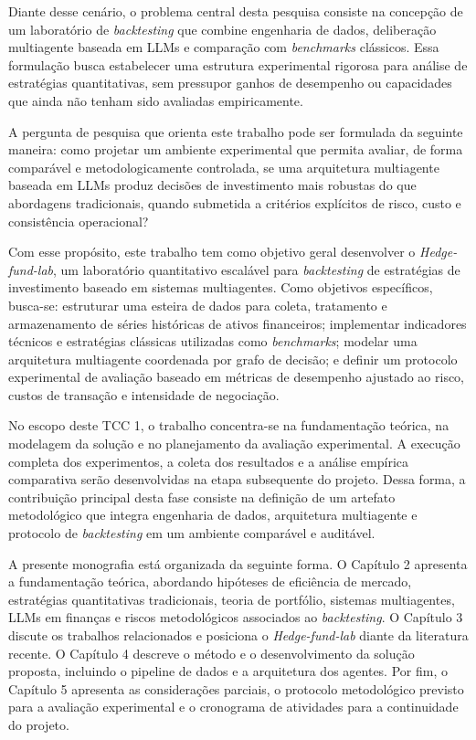 \documentclass{eic-bcc-tcc}
\begin{document}
Diante desse cenário, o problema central desta pesquisa consiste na concepção de um laboratório de \textit{backtesting} que combine engenharia de dados, deliberação multiagente baseada em LLMs e comparação com \textit{benchmarks} clássicos. Essa formulação busca estabelecer uma estrutura experimental rigorosa para análise de estratégias quantitativas, sem pressupor ganhos de desempenho ou capacidades que ainda não tenham sido avaliadas empiricamente.

A pergunta de pesquisa que orienta este trabalho pode ser formulada da seguinte maneira: como projetar um ambiente experimental que permita avaliar, de forma comparável e metodologicamente controlada, se uma arquitetura multiagente baseada em LLMs produz decisões de investimento mais robustas do que abordagens tradicionais, quando submetida a critérios explícitos de risco, custo e consistência operacional?

Com esse propósito, este trabalho tem como objetivo geral desenvolver o \textit{Hedge-fund-lab}, um laboratório quantitativo escalável para \textit{backtesting} de estratégias de investimento baseado em sistemas multiagentes. Como objetivos específicos, busca-se: estruturar uma esteira de dados para coleta, tratamento e armazenamento de séries históricas de ativos financeiros; implementar indicadores técnicos e estratégias clássicas utilizadas como \textit{benchmarks}; modelar uma arquitetura multiagente coordenada por grafo de decisão; e definir um protocolo experimental de avaliação baseado em métricas de desempenho ajustado ao risco, custos de transação e intensidade de negociação.

No escopo deste TCC 1, o trabalho concentra-se na fundamentação teórica, na modelagem da solução e no planejamento da avaliação experimental. A execução completa dos experimentos, a coleta dos resultados e a análise empírica comparativa serão desenvolvidas na etapa subsequente do projeto. Dessa forma, a contribuição principal desta fase consiste na definição de um artefato metodológico que integra engenharia de dados, arquitetura multiagente e protocolo de \textit{backtesting} em um ambiente comparável e auditável.

A presente monografia está organizada da seguinte forma. O Capítulo 2 apresenta a fundamentação teórica, abordando hipóteses de eficiência de mercado, estratégias quantitativas tradicionais, teoria de portfólio, sistemas multiagentes, LLMs em finanças e riscos metodológicos associados ao \textit{backtesting}. O Capítulo 3 discute os trabalhos relacionados e posiciona o \textit{Hedge-fund-lab} diante da literatura recente. O Capítulo 4 descreve o método e o desenvolvimento da solução proposta, incluindo o pipeline de dados e a arquitetura dos agentes. Por fim, o Capítulo 5 apresenta as considerações parciais, o protocolo metodológico previsto para a avaliação experimental e o cronograma de atividades para a continuidade do projeto.
\end{document}
